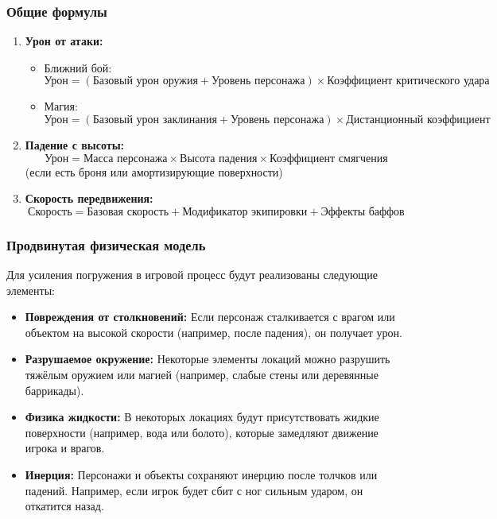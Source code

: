 \documentclass{article}
\begin{document}
\subsubsection{Общие формулы}
\begin{enumerate}
    \item \textbf{Урон от атаки:}
        \begin{itemize}
            \item Ближний бой:
            \[
            \text{Урон} = (\text{Базовый урон оружия} + \text{Уровень персонажа}) \times \text{Коэффициент критического удара}
            \]
            \item Магия:
            \[
            \text{Урон} = (\text{Базовый урон заклинания} + \text{Уровень персонажа}) \times \text{Дистанционный коэффициент}
            \]
        \end{itemize}
    \item \textbf{Падение с высоты:}
        \[
        \text{Урон} = \text{Масса персонажа} \times \text{Высота падения} \times \text{Коэффициент смягчения}
        \]
        (если есть броня или амортизирующие поверхности)
    \item \textbf{Скорость передвижения:}
        \[
        \text{Скорость} = \text{Базовая скорость} + \text{Модификатор экипировки} + \text{Эффекты баффов}
        \]
\end{enumerate}

\subsubsection{Продвинутая физическая модель}

Для усиления погружения в игровой процесс будут реализованы следующие элементы:

\begin{itemize}
    \item \textbf{Повреждения от столкновений:} Если персонаж сталкивается с врагом или объектом на высокой скорости (например, после падения), он получает урон.
    \item \textbf{Разрушаемое окружение:} Некоторые элементы локаций можно разрушить тяжёлым оружием или магией (например, слабые стены или деревянные баррикады).
\item \textbf{Физика жидкости:} В некоторых локациях будут присутствовать жидкие поверхности (например, вода или болото), которые замедляют движение игрока и врагов.
    \item \textbf{Инерция:} Персонажи и объекты сохраняют инерцию после толчков или падений. Например, если игрок будет сбит с ног сильным ударом, он откатится назад.
\end{itemize}
\end{document}
